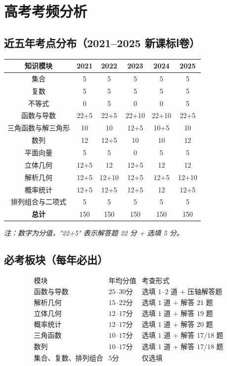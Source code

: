 \section{高考考频分析}

\subsection{近五年考点分布（2021--2025 新课标Ⅰ卷）}

\begin{center}
\begin{tabular}{c|c|c|c|c|c}
\textbf{知识模块} & \textbf{2021} & \textbf{2022} & \textbf{2023} & \textbf{2024} & \textbf{2025} \\ \hline
集合 & 5 & 5 & 5 & 5 & 5 \\
复数 & 5 & 5 & 5 & 5 & 5 \\
不等式 & 0 & 5 & 0 & 0 & 5 \\
函数与导数 & 22+5 & 22+5 & 22+10 & 22+10 & 22+5 \\
三角函数与解三角形 & 10 & 10 & 12+5 & 10+5 & 10 \\
数列 & 12 & 12+5 & 10 & 10 & 12 \\
平面向量 & 5 & 5 & 0 & 5 & 5 \\
立体几何 & 12+5 & 12 & 12+5 & 12 & 12 \\
解析几何 & 12+5 & 12+10 & 12+5 & 12+5 & 12+10 \\
概率统计 & 12+5 & 12+5 & 12+5 & 12 & 12+5 \\
排列组合与二项式 & 5 & 5 & 5 & 5 & 5 \\ \hline
\textbf{总计} & 150 & 150 & 150 & 150 & 150
\end{tabular}
\end{center}

\textit{注：数字为分值，"22+5" 表示解答题 22 分 + 选填 5 分。}

\subsection{必考板块（每年必出）}

\[
\begin{array}{c|c|c}
\text{模块} & \text{年均分值} & \text{考查形式} \\ \hline
\text{函数与导数} & 25\text{--}30 分 & \text{选填 1--2 道 + 压轴解答题} \\
\text{解析几何} & 15\text{--}22 分 & \text{选填 1 道 + 解答 21 题} \\
\text{立体几何} & 12\text{--}17 分 & \text{选填 1 道 + 解答 19 题} \\
\text{概率统计} & 12\text{--}17 分 & \text{选填 1 道 + 解答 20 题} \\
\text{三角函数} & 10\text{--}17 分 & \text{选填 1 道 + 解答 17/18 题} \\
\text{数列} & 10\text{--}17 分 & \text{选填 1 道 + 解答 17/18 题} \\
\text{集合、复数、排列组合} & 5 分 & \text{仅选填}
\end{array}
\]

